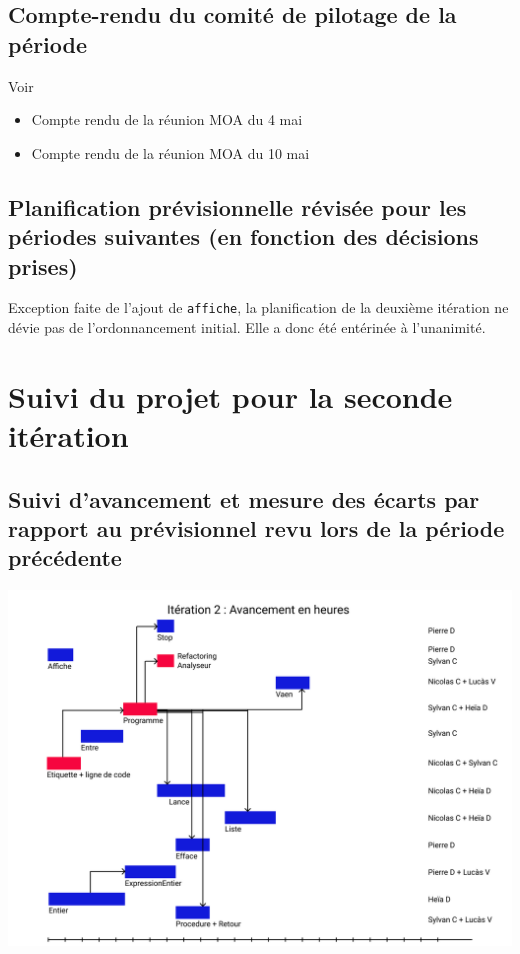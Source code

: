 \documentclass[12pt,a4paper,titlepage,openany, oneside]{report}
\begin{document}
    \subsection{Compte-rendu du comité de pilotage de la période}
        Voir
        \begin{itemize}
            \item Compte rendu de la réunion MOA du 4 mai
            \item Compte rendu de la réunion MOA du 10 mai
        \end{itemize}

    \subsection{Planification prévisionnelle révisée pour les périodes suivantes (en fonction des décisions prises)}
        Exception faite de l'ajout de \verb|affiche|, la planification de la
        deuxième itération ne dévie pas de l'ordonnancement initial. Elle a donc
        été entérinée à l'unanimité.

    \section{Suivi du projet pour la seconde itération}

    \subsection{Suivi d’avancement et mesure des écarts par rapport au prévisionnel revu lors de la période précédente}

    \includegraphics[scale=0.75]{fichiers/planification/iteration2/iteration2Avancement.png}
\end{document}
